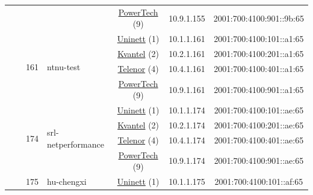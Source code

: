 \begin{small}
\begin{center}
\begin{longtable}{|c|c|c|c|c|c|c|c|}
  &  &  &  & \multicolumn{2}{|c|}{\tiny{\href{http://www.powertech.no}{PowerTech} (9)}} & \tiny{10.9.1.155} & \tiny{2001:700:4100:901::9b:65} \\* \cline{3-3}\cline{4-4}\cline{5-5}\cline{6-6}\cline{7-7}\cline{8-8}
  &  & \multirow{4}{*}{\tiny{161}} & \multicolumn{1}{|l|}{\multirow{4}{*}{\tiny{ntnu-test}}} & \multicolumn{2}{|c|}{\tiny{\href{https://www.uninett.no}{Uninett} (1)}} & \tiny{10.1.1.161} & \tiny{2001:700:4100:101::a1:65} \\* \cline{5-5}\cline{6-6}\cline{7-7}\cline{8-8}
  &  &  &  & \multicolumn{2}{|c|}{\tiny{\href{http://kvantel.no}{Kvantel} (2)}} & \tiny{10.2.1.161} & \tiny{2001:700:4100:201::a1:65} \\* \cline{5-5}\cline{6-6}\cline{7-7}\cline{8-8}
  &  &  &  & \multicolumn{2}{|c|}{\tiny{\href{https://www.telenor.no}{Telenor} (4)}} & \tiny{10.4.1.161} & \tiny{2001:700:4100:401::a1:65} \\* \cline{5-5}\cline{6-6}\cline{7-7}\cline{8-8}
  &  &  &  & \multicolumn{2}{|c|}{\tiny{\href{http://www.powertech.no}{PowerTech} (9)}} & \tiny{10.9.1.161} & \tiny{2001:700:4100:901::a1:65} \\* \cline{3-3}\cline{4-4}\cline{5-5}\cline{6-6}\cline{7-7}\cline{8-8}
  &  & \multirow{4}{*}{\tiny{174}} & \multicolumn{1}{|l|}{\multirow{4}{*}{\tiny{srl-netperformance}}} & \multicolumn{2}{|c|}{\tiny{\href{https://www.uninett.no}{Uninett} (1)}} & \tiny{10.1.1.174} & \tiny{2001:700:4100:101::ae:65} \\* \cline{5-5}\cline{6-6}\cline{7-7}\cline{8-8}
  &  &  &  & \multicolumn{2}{|c|}{\tiny{\href{http://kvantel.no}{Kvantel} (2)}} & \tiny{10.2.1.174} & \tiny{2001:700:4100:201::ae:65} \\* \cline{5-5}\cline{6-6}\cline{7-7}\cline{8-8}
  &  &  &  & \multicolumn{2}{|c|}{\tiny{\href{https://www.telenor.no}{Telenor} (4)}} & \tiny{10.4.1.174} & \tiny{2001:700:4100:401::ae:65} \\* \cline{5-5}\cline{6-6}\cline{7-7}\cline{8-8}
  &  &  &  & \multicolumn{2}{|c|}{\tiny{\href{http://www.powertech.no}{PowerTech} (9)}} & \tiny{10.9.1.174} & \tiny{2001:700:4100:901::ae:65} \\* \cline{3-3}\cline{4-4}\cline{5-5}\cline{6-6}\cline{7-7}\cline{8-8}
  &  & \multirow{4}{*}{\tiny{175}} & \multicolumn{1}{|l|}{\multirow{4}{*}{\tiny{hu-chengxi}}} & \multicolumn{2}{|c|}{\tiny{\href{https://www.uninett.no}{Uninett} (1)}} & \tiny{10.1.1.175} & \tiny{2001:700:4100:101::af:65} \\* \cline{5-5}\cline{6-6}\cline{7-7}\cline{8-8}

\end{longtable}
\end{center}
\end{small}
